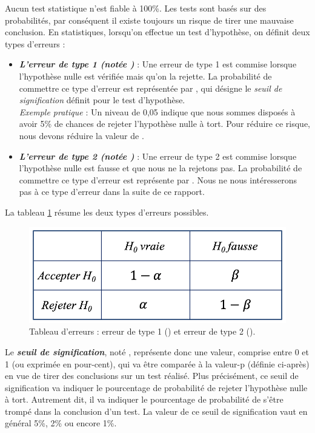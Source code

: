 \documentclass[10pt, oneside, a4paper]{article}
\begin{document}
Aucun test statistique n'est fiable à 100\%. Les tests sont basés sur des probabilités, par conséquent il existe toujours un risque de tirer une mauvaise conclusion. En statistiques, lorsqu'on effectue un test d'hypothèse, on définit deux types d'erreurs : 
\begin{itemize}
\item \textbf{\textit{L'erreur de type 1 (notée \alpha)}} : Une erreur de type 1 est commise lorsque l'hypothèse nulle est vérifiée mais qu'on la rejette. La probabilité de commettre ce type d'erreur est représentée par \alpha, qui désigne le \textit{seuil de signification} définit pour le test d'hypothèse. \\ 
\textit{Exemple pratique} : Un niveau {\alpha} de 0,05 indique que nous sommes disposés à avoir 5\% de chances de rejeter l'hypothèse nulle à tort. Pour réduire ce risque, nous devons réduire la valeur de \alpha.
\item \textbf{\textit{L'erreur de type 2 (notée \beta)}} : Une erreur de type 2 est commise lorsque l'hypothèse nulle est fausse et que nous ne la rejetons pas. La probabilité de commettre ce type d'erreur est représente par \beta. Nous ne nous intéresserons pas à ce type d'erreur dans la suite de ce rapport.
\end{itemize}
La tableau \ref{tab:erreurs} résume les deux types d'erreurs possibles.
\begin{figure}[htbp]
    \centering
    \includegraphics[scale=0.4]{image/erreur}    
    \caption{Tableau d'erreurs : erreur de type 1 (\alpha) et erreur de type 2 (\beta).}    
    \label{tab:erreurs}
\end{figure}

Le \textbf{\textit{seuil de signification}}, noté \alpha, représente donc une valeur, comprise entre 0 et 1 (ou exprimée en pour-cent), qui va être comparée à la valeur-p (définie ci-après) en vue de tirer des conclusions sur un test réalisé. Plus précisément, ce seuil de signification va indiquer le pourcentage de probabilité de rejeter l'hypothèse nulle à tort. Autrement dit, il va indiquer le pourcentage de probabilité de s'être trompé dans la conclusion d'un test. La valeur de ce seuil de signification vaut en général 5\%, 2\% ou encore 1\%.
\end{document}
